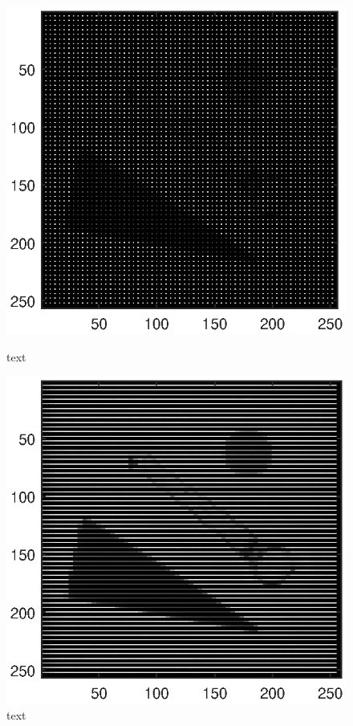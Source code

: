 \documentclass{article}
\begin{document}
\begin{figure}[H]
	\begin{minipage}{0.5\linewidth}
		\centering
		\includegraphics[scale=0.8]{fig8}
		\caption{text}
	\end{minipage}
	\begin{minipage}{0.5\linewidth}
		\centering
		\includegraphics[scale=0.8]{fig9}
		\caption{text}
	\end{minipage}
\end{figure}
\end{document}
